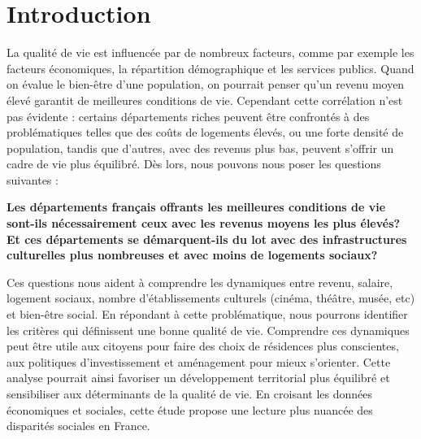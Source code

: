 \documentclass[mstat,12pt]{unswthesis}
\begin{document}


\afterpreface





%
%






\chapter{Introduction}\label{introduction}

La qualité de vie est influencée par de nombreux facteurs, comme par
exemple les facteurs économiques, la répartition démographique et les
services publics. Quand on évalue le bien-être d'une population, on
pourrait penser qu'un revenu moyen élevé garantit de meilleures
conditions de vie. Cependant cette corrélation n'est pas évidente :
certains départements riches peuvent être confrontés à des
problématiques telles que des coûts de logements élevés, ou une forte
densité de population, tandis que d'autres, avec des revenus plus bas,
peuvent s'offrir un cadre de vie plus équilibré. Dès lors, nous pouvons
nous poser les questions suivantes : \bigskip

\begin{center}

\textbf{Les départements français offrants les meilleures conditions de vie sont-ils nécessairement ceux avec les revenus moyens les plus élevés?  Et ces départements se démarquent-ils du lot avec des infrastructures culturelles plus nombreuses et avec moins de logements sociaux?
}

\end{center}
\medskip

\justifying

Ces questions nous aident à comprendre les dynamiques entre revenu,
salaire, logement sociaux, nombre d'établissements culturels (cinéma,
théâtre, musée, etc) et bien-être social. En répondant à cette
problématique, nous pourrons identifier les critères qui définissent une
bonne qualité de vie. Comprendre ces dynamiques peut être utile aux
citoyens pour faire des choix de résidences plus conscientes, aux
politiques d'investissement et aménagement pour mieux s'orienter. Cette
analyse pourrait ainsi favoriser un développement territorial plus
équilibré et sensibiliser aux déterminants de la qualité de vie. En
croisant les données économiques et sociales, cette étude propose une
lecture plus nuancée des disparités sociales en France.
\end{document}
